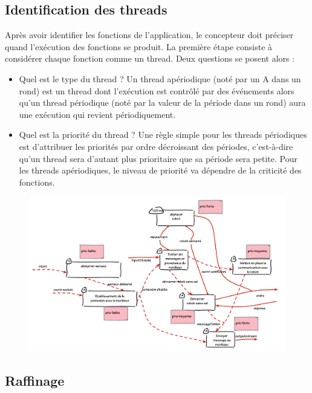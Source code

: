 \documentclass[11pt,a4paper]{paper}
\begin{document}
\subsection{Identification des threads}
Après avoir identifier les fonctions de l'application, le concepteur doit préciser quand l'exécution des fonctions se produit. La première étape consiste à considérer chaque fonction comme un thread. Deux questions se posent alors :
\begin{itemize}
	\item Quel est le type du thread ? Un thread apériodique (noté par un A dans un rond) est un thread dont l'exécution est contrôlé par des événements alors qu'un thread périodique (noté par la valeur de la période dans un rond) aura une exécution qui revient périodiquement.
	\item Quel est la priorité du thread ? Une règle simple pour les threads périodiques est d'attribuer les priorités par ordre décroissant des périodes, c'est-à-dire qu'un thread sera d'autant plus prioritaire que sa période sera petite.  Pour les threads apériodiques, le niveau de priorité va dépendre de la criticité des fonctions.\\
\end{itemize}

 \begin{figure}[htbp]
\begin{center}
\includegraphics[scale=0.5]{figures_pdf/fonc/thread}
\end{center}
\end{figure}
\FloatBarrier

\subsection{Raffinage}
\end{document}

